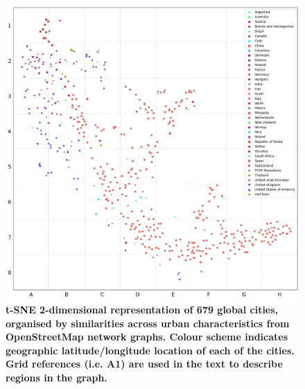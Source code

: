 \documentclass[preprint,10pt]{elsarticle} %
\begin{document}
\begin{figure}
\centering
\includegraphics[trim={ 0 0 0 0 },clip,scale=0.45]{Images/ByCountry_latlong_Zeigler.png}%
\caption{\bf t-SNE 2-dimensional representation of 679 global cities, organised by similarities across urban characteristics from OpenStreetMap network graphs. Colour scheme indicates geographic latitude/longitude location\cite{Jackle2017} of each of the cities. Grid references (i.e. A1) are used in the text to describe regions in the graph.}
 \label{fig:tSNE}
\end{figure}
\end{document}
